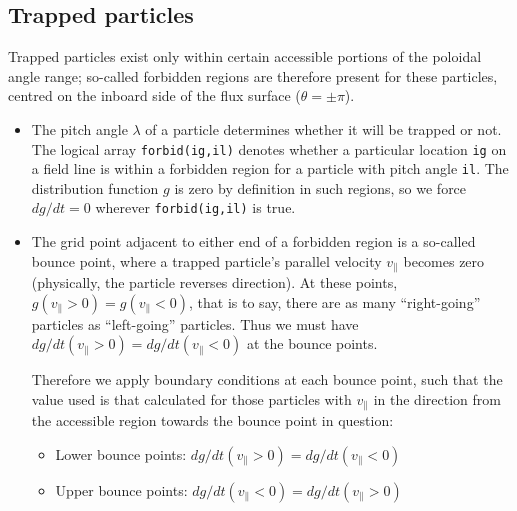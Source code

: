 \documentclass[10pt,a4paper]{article}
\begin{document}
\subsection{Trapped particles}

Trapped particles exist only within certain accessible portions of the
poloidal angle range; so-called forbidden regions are therefore present for
these particles, centred on the inboard side of the flux surface ($\theta =
\pm \pi$).
\begin{itemize}

\item The pitch angle $\lambda$ of a particle determines whether it will be
  trapped or not. The logical array \texttt{forbid(ig,il)} denotes whether a
  particular location \texttt{ig} on a field line is within a forbidden region
  for a particle with pitch angle \texttt{il}. The distribution function $g$
  is zero by definition in such regions, so we force $dg/dt = 0$ wherever
  \texttt{forbid(ig,il)} is true.

\item The grid point adjacent to either end of a forbidden region is a
  so-called bounce point, where a trapped particle's parallel velocity
  $v_\parallel$ becomes zero (physically, the particle reverses direction). At
  these points, $g(v_\parallel > 0) = g(v_\parallel < 0)$, that is to say,
  there are as many ``right-going'' particles as ``left-going''
  particles. Thus we must have $dg/dt(v_\parallel > 0) = dg/dt(v_\parallel <
  0)$ at the bounce points.

  Therefore we apply boundary conditions at each bounce point, such that the
  value used is that calculated for those particles with $v_\parallel$ in the
  direction from the accessible region towards the bounce point in question:
  \begin{itemize}
  \item Lower bounce points: $dg/dt(v_\parallel > 0) = dg/dt(v_\parallel < 0)$
  \item Upper bounce points: $dg/dt(v_\parallel < 0) = dg/dt(v_\parallel > 0)$
  \end{itemize}

\end{itemize}

\end{document}
